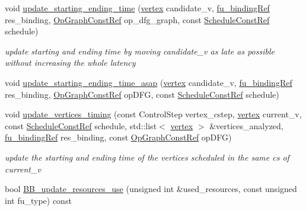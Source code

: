 \begin{DoxyCompactItemize}
\item 
void \hyperlink{classparametric__list__based_a86a22e0ca2f49d25402fd437d8be06a3}{update\+\_\+starting\+\_\+ending\+\_\+time} (\hyperlink{graph_8hpp_abefdcf0544e601805af44eca032cca14}{vertex} candidate\+\_\+v, \hyperlink{fu__binding_8hpp_a619181df8ab98d7b7e17de58ac44b065}{fu\+\_\+binding\+Ref} res\+\_\+binding, \hyperlink{op__graph_8hpp_a9a0b240622c47584bee6951a6f5de746}{Op\+Graph\+Const\+Ref} op\+\_\+dfg\+\_\+graph, const \hyperlink{schedule_8hpp_a85e4dea8a1611026193d8ca13fc5a260}{Schedule\+Const\+Ref} schedule)
\begin{DoxyCompactList}\small\item\em update starting and ending time by moving candidate\+\_\+v as late as possible without increasing the whole latency \end{DoxyCompactList}\item 
void \hyperlink{classparametric__list__based_a155c333d3654eb3f35cc055b6b97265c}{update\+\_\+starting\+\_\+ending\+\_\+time\+\_\+asap} (\hyperlink{graph_8hpp_abefdcf0544e601805af44eca032cca14}{vertex} candidate\+\_\+v, \hyperlink{fu__binding_8hpp_a619181df8ab98d7b7e17de58ac44b065}{fu\+\_\+binding\+Ref} res\+\_\+binding, \hyperlink{op__graph_8hpp_a9a0b240622c47584bee6951a6f5de746}{Op\+Graph\+Const\+Ref} op\+D\+FG, const \hyperlink{schedule_8hpp_a85e4dea8a1611026193d8ca13fc5a260}{Schedule\+Const\+Ref} schedule)
\item 
void \hyperlink{classparametric__list__based_aff2bc058e15e80cd66b5e33245771289}{update\+\_\+vertices\+\_\+timing} (const Control\+Step vertex\+\_\+cstep, \hyperlink{graph_8hpp_abefdcf0544e601805af44eca032cca14}{vertex} current\+\_\+v, const \hyperlink{schedule_8hpp_a85e4dea8a1611026193d8ca13fc5a260}{Schedule\+Const\+Ref} schedule, std\+::list$<$ \hyperlink{graph_8hpp_abefdcf0544e601805af44eca032cca14}{vertex} $>$ \&vertices\+\_\+analyzed, \hyperlink{fu__binding_8hpp_a619181df8ab98d7b7e17de58ac44b065}{fu\+\_\+binding\+Ref} res\+\_\+binding, const \hyperlink{op__graph_8hpp_a9a0b240622c47584bee6951a6f5de746}{Op\+Graph\+Const\+Ref} op\+D\+FG)
\begin{DoxyCompactList}\small\item\em update the starting and ending time of the vertices scheduled in the same cs of current\+\_\+v \end{DoxyCompactList}\item 
bool \hyperlink{classparametric__list__based_a3295dddee18a9c4091ad9bec2b23cc9f}{B\+B\+\_\+update\+\_\+resources\+\_\+use} (unsigned int \&used\+\_\+resources, const unsigned int fu\+\_\+type) const

\end{DoxyCompactItemize}
